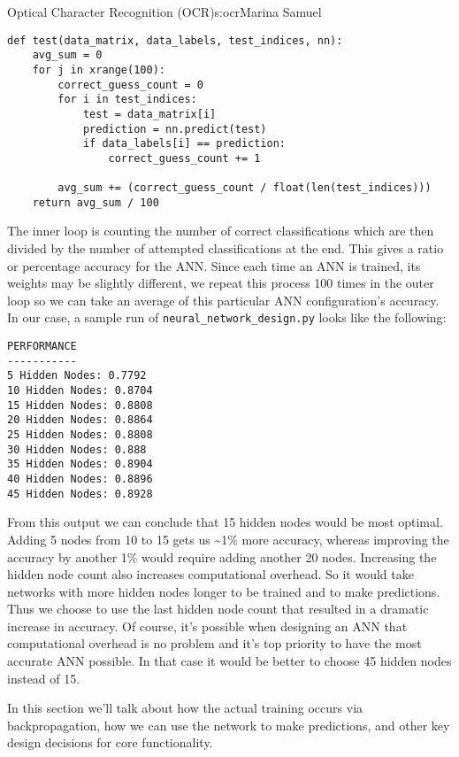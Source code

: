 \begin{aosachapter}{Optical Character Recognition (OCR)}{s:ocr}{Marina Samuel}
\begin{verbatim}
def test(data_matrix, data_labels, test_indices, nn):
    avg_sum = 0
    for j in xrange(100):
        correct_guess_count = 0
        for i in test_indices:
            test = data_matrix[i]
            prediction = nn.predict(test)
            if data_labels[i] == prediction:
                correct_guess_count += 1

        avg_sum += (correct_guess_count / float(len(test_indices)))
    return avg_sum / 100
\end{verbatim}

The inner loop is counting the number of correct classifications which
are then divided by the number of attempted classifications at the end.
This gives a ratio or percentage accuracy for the ANN. Since each time
an ANN is trained, its weights may be slightly different, we repeat this
process 100 times in the outer loop so we can take an average of this
particular ANN configuration's accuracy. In our case, a sample run of
\texttt{neural\_network\_design.py} looks like the following:

\begin{verbatim}
PERFORMANCE
-----------
5 Hidden Nodes: 0.7792
10 Hidden Nodes: 0.8704
15 Hidden Nodes: 0.8808
20 Hidden Nodes: 0.8864
25 Hidden Nodes: 0.8808
30 Hidden Nodes: 0.888
35 Hidden Nodes: 0.8904
40 Hidden Nodes: 0.8896
45 Hidden Nodes: 0.8928
\end{verbatim}

From this output we can conclude that 15 hidden nodes would be most
optimal. Adding 5 nodes from 10 to 15 gets us \textasciitilde{}1\% more
accuracy, whereas improving the accuracy by another 1\% would require
adding another 20 nodes. Increasing the hidden node count also increases
computational overhead. So it would take networks with more hidden nodes
longer to be trained and to make predictions. Thus we choose to use the
last hidden node count that resulted in a dramatic increase in accuracy.
Of course, it's possible when designing an ANN that computational
overhead is no problem and it's top priority to have the most accurate
ANN possible. In that case it would be better to choose 45 hidden nodes
instead of 15.

\label{core-ocr-functionality}

In this section we'll talk about how the actual training occurs via
backpropagation, how we can use the network to make predictions, and
other key design decisions for core functionality.


\end{aosachapter}
